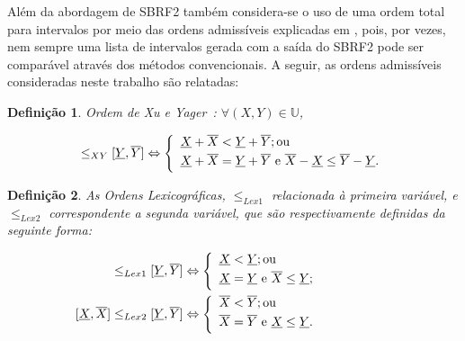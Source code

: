 \documentclass[tcc,capa]{texufpel}
\newtheorem{Def}{Defini\c c\~ao}
\begin{document}
Além da abordagem de SBRF2 também considera-se o uso de uma ordem total para intervalos por meio das ordens admissíveis explicadas em \cite{bustince2013generation, zapata2017interval}, pois, por vezes, nem sempre uma lista de intervalos gerada com a saída do SBRF2 pode ser comparável através dos métodos convencionais. A seguir, as ordens admissíveis consideradas neste trabalho são relatadas:

\begin{Def} \label{DefOrdemXueYager}
Ordem de Xu e Yager~\cite{xu2006some}: $ \forall (X,Y) \in \mathbb{U}$, 

\begin{equation*}
[\underline{X}, \overline{X}] \leq_{XY} [\underline{Y}, \overline{Y}] \Leftrightarrow  
\left\{\begin{array}{l} \vspace{0.1cm}
\underline{X} + \overline{X} < \underline{Y} + \overline{Y};  \mbox{ou} \\ 
\underline{X} + \overline{X} = \underline{Y} + \overline{Y} ~\mbox{e}~ \overline{X} - \underline{X} \leq \overline{Y} - \underline{Y}.  \vspace{0.1cm}
\end{array}\right.
\end{equation*}
\end{Def}


\begin{Def}
As Ordens Lexicográficas, $\leq_{Lex1}$ relacionada à primeira variável, e $\leq_{Lex2}$ correspondente a segunda variável, que são respectivamente definidas da seguinte forma:
  
\begin{align*}
[\underline{X}, \overline{X}] \leq_{Lex1} [\underline{Y}, \overline{Y}] & \Leftrightarrow \left\{\begin{array}{l} \vspace{0.1cm}
\underline{X} < \underline{Y}; \mbox{ou} \\ 
\underline{X} = \underline{Y} ~\mbox{e}~ \overline{X} \leq \underline{Y};
\vspace{0.1cm}
\end{array}\right.\\
[\underline{X}, \overline{X}] \leq_{Lex2} [\underline{Y}, \overline{Y}] & \Leftrightarrow \left\{\begin{array}{l} \vspace{0.1cm}
\overline{X} < \overline{Y}; \mbox{ou} \\ 
\overline{X} = \overline{Y} ~\mbox{e}~ \underline{X} \leq \underline{Y}.\hspace{2.0cm}
\vspace{0.1cm}
\end{array}\right.
\end{align*}

\end{Def}
\end{document}
